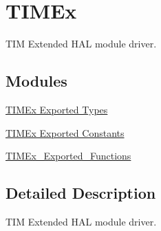\hypertarget{group___t_i_m_ex}{\section{T\-I\-M\-Ex}
\label{group___t_i_m_ex}
}


T\-I\-M Extended H\-A\-L module driver.  


\subsection*{Modules}
\begin{DoxyCompactItemize}
\item 
\hyperlink{group___t_i_m_ex___exported___types}{T\-I\-M\-Ex Exported Types}
\item 
\hyperlink{group___t_i_m_ex___exported___constants}{T\-I\-M\-Ex Exported Constants}
\item 
\hyperlink{group___t_i_m_ex___exported___functions}{T\-I\-M\-Ex\-\_\-\-Exported\-\_\-\-Functions}
\end{DoxyCompactItemize}


\subsection{Detailed Description}
T\-I\-M Extended H\-A\-L module driver. 